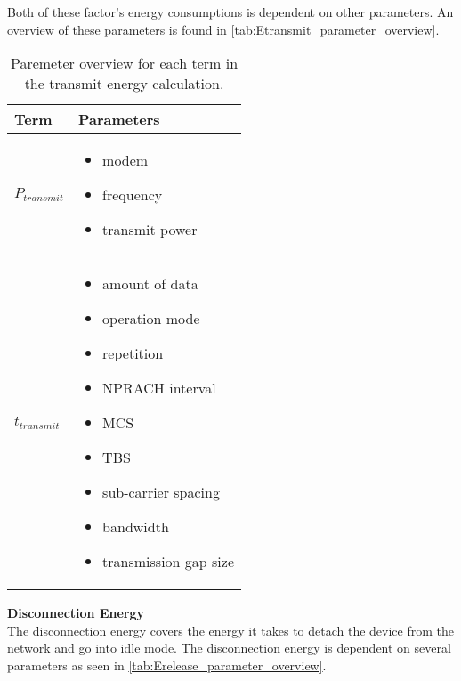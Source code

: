Both of these factor's energy consumptions is dependent on other parameters. An overview of these parameters is found in \autoref{tab:Etransmit_parameter_overview}.

\begin{table}[H]
\centering
\begin{tabular}{|m{3cm}|m{6cm}|} \hline
\textbf{Term} & \textbf{Parameters} \\ \hline
$P_{transmit}$ & \begin{itemize}
\item modem
\item frequency
\item transmit power 
\end{itemize} \\ \hline
$t_{transmit}$ & \begin{itemize}
\item amount of data
\item operation mode
\item repetition
\item NPRACH interval
\item \gls{MCS}
\item \gls{TBS}
\item sub-carrier spacing
\item bandwidth
\item transmission gap size
\end{itemize} \\ \hline
\end{tabular}
\caption{Paremeter overview for each term in the transmit energy calculation.}
\label{tab:Etransmit_parameter_overview}
\end{table}


\textbf{Disconnection Energy}\\
The disconnection energy covers the energy it takes to detach the device from the network and go into idle mode. The disconnection energy is dependent on several parameters as seen in \autoref{tab:Erelease_parameter_overview}.

